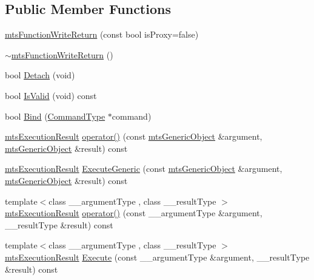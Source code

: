\subsection*{Public Member Functions}
\begin{DoxyCompactItemize}
\item 
\hyperlink{classmts_function_write_return_a888e54e6998747c0a9d960da550d9be8}{mts\-Function\-Write\-Return} (const bool is\-Proxy=false)
\item 
\hyperlink{classmts_function_write_return_aa5acc0af80061ee2b861b90f55f5f359}{$\sim$mts\-Function\-Write\-Return} ()
\item 
bool \hyperlink{classmts_function_write_return_ae89669a12aeb0cb18ca3b7dc868f5684}{Detach} (void)
\item 
bool \hyperlink{classmts_function_write_return_acd8201536236c23b5b1a5290d801018a}{Is\-Valid} (void) const 
\item 
bool \hyperlink{classmts_function_write_return_ae25c9ce73fdb2c24d6cba15ee788e02c}{Bind} (\hyperlink{classmts_function_write_return_ac896d3571d680531a898daf398774881}{Command\-Type} $\ast$command)
\item 
\hyperlink{classmts_execution_result}{mts\-Execution\-Result} \hyperlink{classmts_function_write_return_ac4775bc92af01d5f4b505f17a8999c51}{operator()} (const \hyperlink{classmts_generic_object}{mts\-Generic\-Object} \&argument, \hyperlink{classmts_generic_object}{mts\-Generic\-Object} \&result) const 
\item 
\hyperlink{classmts_execution_result}{mts\-Execution\-Result} \hyperlink{classmts_function_write_return_af37cce99779df86483046110eb1eb79b}{Execute\-Generic} (const \hyperlink{classmts_generic_object}{mts\-Generic\-Object} \&argument, \hyperlink{classmts_generic_object}{mts\-Generic\-Object} \&result) const 
\item 
{\footnotesize template$<$class \-\_\-\-\_\-argument\-Type , class \-\_\-\-\_\-result\-Type $>$ }\\\hyperlink{classmts_execution_result}{mts\-Execution\-Result} \hyperlink{classmts_function_write_return_a7a80a6d3411e8e3197f91a18ee4d28bb}{operator()} (const \-\_\-\-\_\-argument\-Type \&argument, \-\_\-\-\_\-result\-Type \&result) const 
\item 
{\footnotesize template$<$class \-\_\-\-\_\-argument\-Type , class \-\_\-\-\_\-result\-Type $>$ }\\\hyperlink{classmts_execution_result}{mts\-Execution\-Result} \hyperlink{classmts_function_write_return_a419c077434c89d092ea58e1ff8671284}{Execute} (const \-\_\-\-\_\-argument\-Type \&argument, \-\_\-\-\_\-result\-Type \&result) const 

\end{DoxyCompactItemize}
